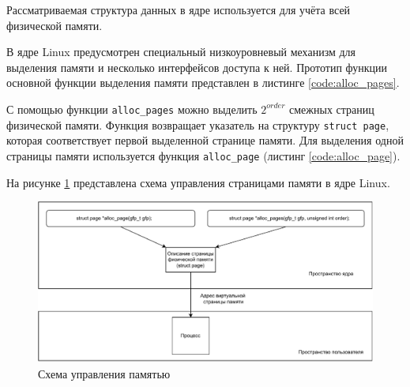 Рассматриваемая структура данных в ядре используется для учёта всей физической памяти.

В ядре Linux предусмотрен специальный низкоуровневый механизм для выделения памяти и несколько интерфейсов доступа к ней. Прототип функции основной функции выделения памяти представлен в листинге \ref{code:alloc_pages}.


С помощью функции \texttt{alloc\_pages} можно выделить $2^{order}$ смежных страниц физической памяти. Функция возвращает указатель на структуру \texttt{struct page}, которая соответствует первой выделенной странице памяти. Для выделения одной страницы памяти используется функция \texttt{alloc\_page} (листинг \ref{code:alloc_page}).


На рисунке \ref{fig:memory_schema} представлена схема управления страницами памяти в ядре Linux.

\begin{figure}[h]
	\centering
	\includegraphics[width=\textwidth]{img/memory.pdf}
	\caption{Схема управления памятью}
	\label{fig:memory_schema}
\end{figure}

